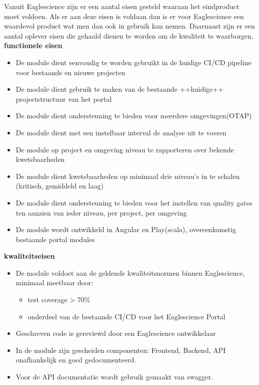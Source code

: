 Vanuit Eaglescience zijn er een aantal eisen gesteld waaraan het eindproduct moet voldoen. Als er aan deze eisen is voldaan dan is er voor Eaglescience een waardevol product wat men dan ook in gebruik kan nemen. Daarnaast zijn er een aantal oplever eisen die gehaald dienen te worden om de kwaliteit te waarborgen. \\

\textbf{functionele eisen}
\begin{itemize}
\item De module dient eenvoudig te worden gebruikt in de huidige CI/CD pipeline voor bestaande en nieuwe projecten
\item De module dient gebruik te maken van de bestaande ++huidige++ projectstructuur van het portal
\item De module dient ondersteuning te bieden voor meerdere omgevingen(OTAP)
\item De module dient met een instelbaar interval de analyse uit te voeren
\item De module op project en omgeving niveau te rapporteren over bekende kwetsbaarheden
\item De module dient kwetsbaarheden op minimaal drie niveau’s in te schalen (kritisch, gemiddeld en laag)
\item De module dient ondersteuning te bieden voor het instellen van quality gates ten aanzien van ieder niveau, per project, per omgeving
\item De module wordt ontwikkeld in Angular en Play(scala), overeenkomstig bestaande portal modules
\end{itemize}
\textbf{kwaliteitseisen}
\begin{itemize}
\item De module voldoet aan de geldende kwaliteitsnormen binnen Eaglescience, minimaal meetbaar door:
	\begin{itemize}
	\item test coverage > 70\%
	\item onderdeel van de bestaande CI/CD voor het Eaglescience Portal
	\end{itemize}
\item Geschreven code is gereviewd door een Eaglescience ontwikkelaar
\item In de module zijn gescheiden componenten: Frontend, Backend, API onafhankelijk en goed gedocumenteerd.
\item Voor de API documentatie wordt gebruik gemaakt van swagger.
\end{itemize}

